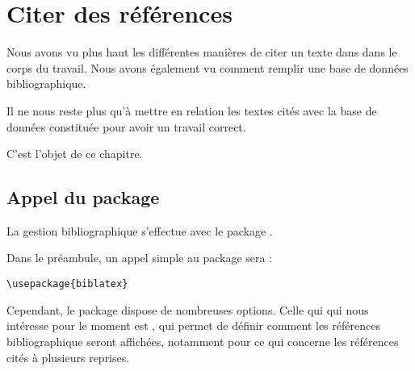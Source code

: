 \chapter{Citer des références}

\begin{prealable}
Nous avons vu plus haut les différentes manières de citer un texte dans  dans le corps du travail. Nous avons également vu comment remplir une base de données bibliographique.

Il ne nous reste plus qu'à mettre en relation les textes cités avec la base de données constituée pour avoir un travail correct.

C'est l'objet de ce chapitre.

\end{prealable}


\section[Appel du package]{Appel du package }

La gestion bibliographique s'effectue avec le package .

Dans le préambule, un appel simple au package sera :

\begin{verbatim}
\usepackage{biblatex}
\end{verbatim}

Cependant, le package dispose de nombreuses options. Celle qui qui nous intéresse pour le moment est , qui permet de définir comment les références bibliographique seront affichées, notamment pour ce qui concerne les références cités à plusieurs reprises.


